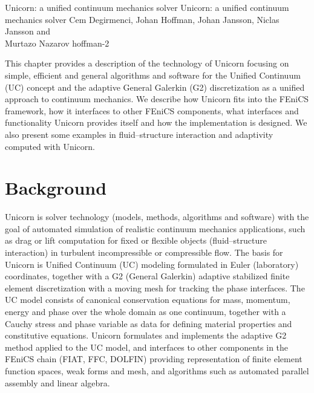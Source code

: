               {Unicorn: a unified continuum mechanics solver}
              {Unicorn: a unified continuum mechanics solver}
              {Cem Degirmenci, Johan Hoffman, Johan Jansson,
                Niclas Jansson and \\ Murtazo Nazarov}
              {hoffman-2}

This chapter provides a description of the technology of Unicorn
focusing on simple, efficient and general algorithms and software for
the Unified Continuum (UC) concept and the adaptive General Galerkin
(G2) discretization as a unified approach to continuum mechanics. We
describe how Unicorn fits into the FEniCS framework, how it interfaces
to other FEniCS components, what interfaces and functionality Unicorn
provides itself and how the implementation is designed. We also
present some examples in fluid--structure interaction and adaptivity
computed with Unicorn.


\section{Background}

Unicorn is solver technology (models, methods, algorithms and
software) with the goal of automated simulation of realistic continuum
mechanics applications, such as drag or lift computation for fixed or
flexible objects (fluid--structure interaction) in turbulent
incompressible or compressible flow. The basis for Unicorn is Unified
Continuum (UC) modeling \citep{HoffmanJanssonStockli2011} formulated
in Euler (laboratory) coordinates, together with a G2 (General
Galerkin) adaptive stabilized finite element discretization with a
moving mesh for tracking the phase interfaces. The UC model consists
of canonical conservation equations for mass, momentum, energy and
phase over the whole domain as one continuum, together with a Cauchy
stress and phase variable as data for defining material properties and
constitutive equations. Unicorn formulates and implements the adaptive
G2 method applied to the UC model, and interfaces to other components
in the FEniCS chain (FIAT, FFC, DOLFIN) providing representation of
finite element function spaces, weak forms and mesh, and algorithms
such as automated parallel assembly and linear algebra.


